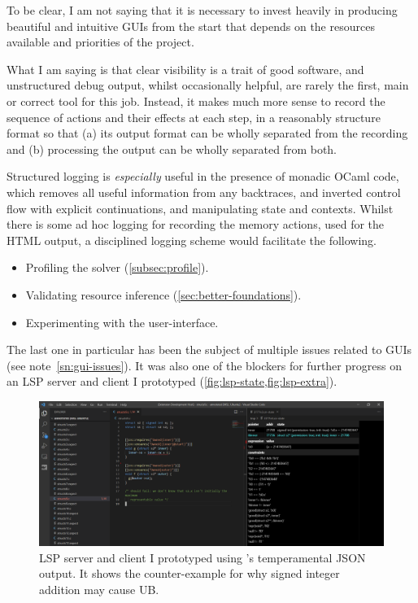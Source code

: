To be clear, I am not saying that it is necessary to invest heavily in
producing beautiful and intuitive GUIs from the start \textemdash{} that
depends on the resources available and priorities of the project.

What I am saying is that clear visibility is a trait of good software, and
unstructured debug output, whilst occasionally helpful, are rarely the first,
main or correct tool for this job. Instead, it makes much more sense to record
the sequence of actions and their effects at each step, in a reasonably
structure format so that (a) its output format can be wholly separated from the
recording and (b) processing the output can be wholly separated from both.

Structured logging is \emph{especially} useful in the presence of monadic OCaml
code, which removes all useful information from any backtraces, and inverted
control flow with explicit continuations, and manipulating state and contexts.
Whilst there is some ad hoc logging for recording the memory actions, used
for the HTML output, a disciplined logging scheme would facilitate the
following.
\begin{itemize}
    \item Profiling the solver (\cref{subsec:profile}).
    \item Validating resource inference (\cref{sec:better-foundations}).
    \item Experimenting with the user-interface.
\end{itemize}

The last one in particular has been the subject of multiple issues related to
GUIs (see note~\ref{sn:gui-issues}). It was also one of the blockers for
further progress on an LSP
server and
client I
prototyped (\cref{fig:lsp-state,fig:lsp-extra}).

\begin{figure}[htp]
    \includegraphics{figures/lsp-structs9-state.png}
    \caption{LSP server and client I prototyped using 's temperamental
        JSON output. It shows the counter-example for why signed integer
        addition may cause UB.}\label{fig:lsp-state}
\end{figure}


